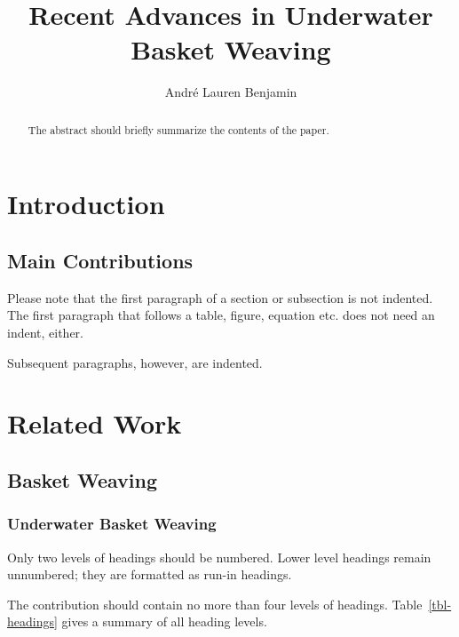 \documentclass[
  runningheads]{llncs}
\title{Recent Advances in Underwater Basket Weaving}
\author{André Lauren Benjamin}
\date{}
\begin{document}
\maketitle
\begin{abstract}
The abstract should briefly summarize the contents of the paper.
\end{abstract}


\section{Introduction}\label{sec-intro}

\subsection{Main Contributions}\label{main-contributions}

Please note that the first paragraph of a section or subsection is not
indented. The first paragraph that follows a table, figure, equation
etc. does not need an indent, either.

Subsequent paragraphs, however, are indented.

\section{Related Work}\label{related-work}

\subsection{Basket Weaving}\label{basket-weaving}

\subsubsection{Underwater Basket
Weaving}\label{underwater-basket-weaving}

Only two levels of headings should be numbered. Lower level headings
remain unnumbered; they are formatted as run-in headings.

The contribution should contain no more than four levels of headings.
Table~\ref{tbl-headings} gives a summary of all heading levels.
\end{document}
